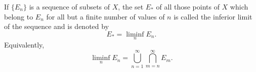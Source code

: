 If $\{E_n\}$ is a sequence of subsets of $X$, the set $E_*$ of all those points of $X$ which belong to $E_n$ for all but a finite number of values of $n$ is called the inferior limit of the sequence and is denoted by
$$E_* = \liminf_n E_n.$$
Equivalently,
$$\liminf_n E_n = \bigcup_{n=1}^{\infty} \bigcap_{m=n}^{\infty} E_m.$$
